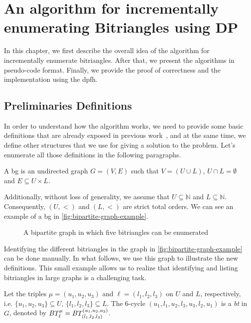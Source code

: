 \chapter[An Algorithm for Incrementally Enumerating Bitriangles]{An algorithm for incrementally enumerating Bitriangles using DP}\label{incr-algo-bt-dp}
In this chapter, we first describe the overall idea of the algorithm for incrementally enumerate 
bitriangles. After that, we present the algorithms in pseudo-code format. Finally, we provide the proof of correctness and the implementation using the \acrshort{dpfh}.  

\section{Preliminaries Definitions}\label{sec:prem:def}
In order to understand how the algorithm works, we need to provide some basic definitions that are already exposed in previous work~\cite{btcount}, and
at the same time, we define other structures that we use for giving a solution to the problem.
Let's enumerate all those definitions in the following paragraphs.

\begin{definition}[\acrlong{bg}] 
A \acrfull{bg} is an undirected graph $G=(V,E)$  such that $V=(U\cup L)$, $U\cap L=\emptyset$ and $E\subseteq U\times L$.
\end{definition}

Additionally, without loss of generality, we assume that  $U\subseteq \mathbb{N}$ and $L\subseteq \mathbb{N}$. Consequently, $(U,<)$  and $(L,<)$ are strict total orders. We can see an example of a \acrshort{bg}
in \autoref{fig:bipartite-graph-example}.

\begin{figure}[ht]
\centering	
{}
\caption[{[\acrshort{iebt}] Example of \acrlong{bg}}]{A bipartite graph in which five bitriangles can be enumerated}
\label{fig:bipartite-graph-example}
\end{figure}

Identifying the different bitriangles in the graph in \autoref{fig:bipartite-graph-example} can be done manually. 
In what follows, we use this graph to illustrate the new definitions. 
This small example allows us to realize that identifying and listing bitriangles in large graphs is a challenging task.

\begin{definition}[\acrlong{bt}]\label{def:bt}
Let the triples $\mu=(u_1, u_2, u_3)$ and $\ell=(l_1, l_2,l_3)$ on $U$ and $L$, respectively, i.e.  $\{u_1, u_2, u_3\} \subseteq U$, $\{l_1, l_2,l_3\} \subseteq L$. 
The 6-cycle $(u_1,l_1,u_2,l_3,u_3,l_2,u_1)$  is a \textit{\acrfull{bt}} in $G$, denoted by $BT_{\ell}^{\mu} = BT_{(l_1, l_2,l_3)}^{(u_1, u_2, u_3)}$. 
\end{definition}      

